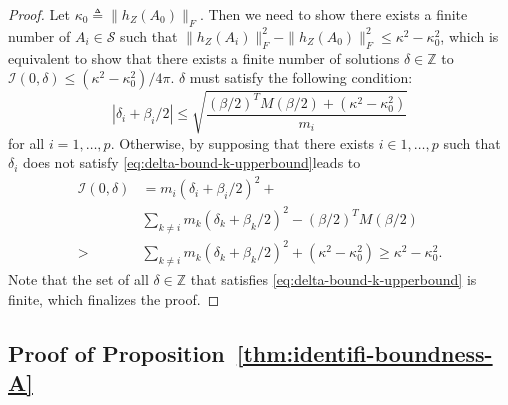 \documentclass[letterpaper,10pt,journal,final]{IEEEtran}
\theoremstyle{definition}
\theoremstyle{remark}
\begin{document}
\begin{proof}
  Let $\kappa_0 \triangleq \|h_Z(A_0)\|_F$. Then we need to show there exists a finite number of $A_i \in {\mathcal{S}}$ such that $\|h_Z(A_i)\|_F^2 - \|h_Z(A_0)\|_F^2 \leq \kappa^2 - \kappa_0^2$, which is equivalent to show that there exists a finite number of solutions $\delta \in \mathbb{Z}$ to $\mathscr{I}(0, \delta) \leq (\kappa^2 - \kappa_0^2)/4\pi$. $\delta$ must satisfy the following condition:
  \begin{equation}
    \label{eq:delta-bound-k-upperbound}
    | \delta_i + \beta_i/2| \leq \sqrt{\frac{(\beta/2)^TM(\beta/2) + (\kappa^2 - \kappa_0^2)}{m_i}}
  \end{equation}
  for all $i =  1, \dots, p$. Otherwise, by supposing that there exists $i \in {1,\dots,p}$ such that $\delta_i$ does not satisfy \eqref{eq:delta-bound-k-upperbound}leads to
  \begin{align*}
    \mathscr{I}(0,\delta) &= m_i(\delta_i + \beta_i/2)^2 + \\
    & \sum_{k \neq i} m_k(\delta_k + \beta_k/2)^2 - (\beta/2)^T M (\beta/2) \\
                > & \sum_{k \neq i} m_k(\delta_k + \beta_k/2)^2 + (\kappa^2 - \kappa_0^2) \geq \kappa^2 - \kappa_0^2.
  \end{align*}
  Note that the set of all $\delta \in \mathbb{Z}$ that satisfies \eqref{eq:delta-bound-k-upperbound} is finite, which finalizes the proof.
\end{proof}

\subsection{Proof of Proposition~\ref{thm:identifi-boundness-A}}
\label{appdix:subsec:proof-proposition-boundedness}
\end{document}
